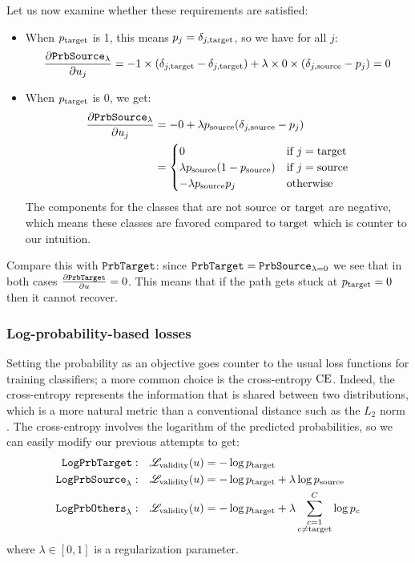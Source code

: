 \documentclass[../main.tex]{subfiles}
\begin{document}
Let us now examine whether these requirements are satisfied:
\begin{itemize}
    \item When $p_{\mathrm{target}}$ is 1, this means $p_j = \delta_{j, \mathrm{target}}$, so we have for all $j$:
          \begin{equation*}
\frac{\partial \mathtt{PrbSource}_{\lambda}}{\partial u_j} = -1 \times (\delta_{j, \mathrm{target}} -\delta_{j, \mathrm{target}}) + \lambda \times 0 \times (\delta_{j, \mathrm{source}} - p_j) = 0
          \end{equation*}
    \item When $p_{\mathrm{target}}$ is 0, we get:
          \begin{align*}
\frac{\partial \mathtt{PrbSource}_{\lambda}}{\partial u_j}
& = -0 + \lambda p_{\mathrm{source}} (\delta_{j, \mathrm{source}} - p_j)                        \\
               & = \begin{cases}
                       0                         & \text{if } j = \mathrm{target} \\
\lambda p_{\mathrm{source}} (1 - p_{\mathrm{source}}) & \text{if } j = \mathrm{source} \\
- \lambda p_{\mathrm{source}} p_j           & \text{otherwise}
                   \end{cases}
          \end{align*}
          The components for the classes that are not $\mathrm{source}$ or $\mathrm{target}$ are negative, which means these classes are favored compared to $\mathrm{target}$ which is counter to our intuition.
\end{itemize}

Compare this with $\mathtt{PrbTarget}$: since $\mathtt{PrbTarget} = \mathtt{PrbSource}_{\lambda=0}$ we see that in both cases $\frac{\partial \mathtt{PrbTarget}}{\partial u} = 0$.
This means that if the path gets stuck at $p_{\mathrm{target}} = 0$ then it cannot recover.

\subsubsection{Log-probability-based losses}

Setting the probability as an objective goes counter to the usual loss functions for training classifiers; a more common choice is the cross-entropy $\text{CE}$.
Indeed, the cross-entropy represents the information that is shared between two distributions, which is a more natural metric than a conventional distance such as the $L_2$ norm \cite{murphyMachine2012}.
The cross-entropy involves the logarithm of the predicted probabilities, so we can easily modify our previous attempts to get:
\begin{align*}
    \mathtt{LogPrbTarget}{}:        & \quad    \mathscr{L}_\text{validity}(u) = - \log p_{\mathrm{target}}                              \\
    \mathtt{LogPrbSource}_{\lambda}: & \quad     \mathscr{L}_\text{validity}(u) = - \log p_{\mathrm{target}} + \lambda \log p_{\mathrm{source}}    \\
    \mathtt{LogPrbOthers}_{\lambda}: & \quad    \mathscr{L}_\text{validity}(u) = - \log p_{\mathrm{target}} + \lambda \sum_{\substack{{c}=1 \\ {c} \neq \mathrm{target}}}^C \log p_c
\end{align*}
where $\lambda \in [0, 1]$ is a regularization parameter.
\end{document}
